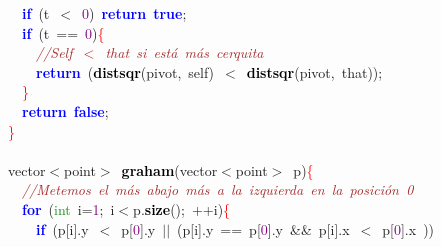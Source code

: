 {{\mbox{}\ \ \textbf{\textcolor{Blue}{if}}\ \textcolor{BrickRed}{(}t\ \textcolor{BrickRed}{$<$}\ \textcolor{Purple}{0}\textcolor{BrickRed}{)}\ \textbf{\textcolor{Blue}{return}}\ \textbf{\textcolor{Blue}{true}}\textcolor{BrickRed}{;} \\
\mbox{}\ \ \textbf{\textcolor{Blue}{if}}\ \textcolor{BrickRed}{(}t\ \textcolor{BrickRed}{==}\ \textcolor{Purple}{0}\textcolor{BrickRed}{)}\textcolor{Red}{\{} \\
\mbox{}\ \ \ \ \textit{\textcolor{Brown}{//Self\ $<$\ that\ si\ está\ más\ cerquita}} \\
\mbox{}\ \ \ \ \textbf{\textcolor{Blue}{return}}\ \textcolor{BrickRed}{(}\textbf{\textcolor{Black}{distsqr}}\textcolor{BrickRed}{(}pivot\textcolor{BrickRed}{,}\ self\textcolor{BrickRed}{)}\ \textcolor{BrickRed}{$<$}\ \textbf{\textcolor{Black}{distsqr}}\textcolor{BrickRed}{(}pivot\textcolor{BrickRed}{,}\ that\textcolor{BrickRed}{));} \\
\mbox{}\ \ \textcolor{Red}{\}} \\
\mbox{}\ \ \textbf{\textcolor{Blue}{return}}\ \textbf{\textcolor{Blue}{false}}\textcolor{BrickRed}{;} \\
\mbox{}\textcolor{Red}{\}} \\
\mbox{} \\
\mbox{}vector\textcolor{BrickRed}{$<$}point\textcolor{BrickRed}{$>$}\ \textbf{\textcolor{Black}{graham}}\textcolor{BrickRed}{(}vector\textcolor{BrickRed}{$<$}point\textcolor{BrickRed}{$>$}\ p\textcolor{BrickRed}{)}\textcolor{Red}{\{} \\
\mbox{}\ \ \textit{\textcolor{Brown}{//Metemos\ el\ más\ abajo\ más\ a\ la\ izquierda\ en\ la\ posición\ 0}} \\
\mbox{}\ \ \textbf{\textcolor{Blue}{for}}\ \textcolor{BrickRed}{(}\textcolor{ForestGreen}{int}\ i\textcolor{BrickRed}{=}\textcolor{Purple}{1}\textcolor{BrickRed}{;}\ i\textcolor{BrickRed}{$<$}p\textcolor{BrickRed}{.}\textbf{\textcolor{Black}{size}}\textcolor{BrickRed}{();}\ \textcolor{BrickRed}{++}i\textcolor{BrickRed}{)}\textcolor{Red}{\{} \\
\mbox{}\ \ \ \ \textbf{\textcolor{Blue}{if}}\ \textcolor{BrickRed}{(}p\textcolor{BrickRed}{[}i\textcolor{BrickRed}{].}y\ \textcolor{BrickRed}{$<$}\ p\textcolor{BrickRed}{[}\textcolor{Purple}{0}\textcolor{BrickRed}{].}y\ \textcolor{BrickRed}{$|$$|$}\ \textcolor{BrickRed}{(}p\textcolor{BrickRed}{[}i\textcolor{BrickRed}{].}y\ \textcolor{BrickRed}{==}\ p\textcolor{BrickRed}{[}\textcolor{Purple}{0}\textcolor{BrickRed}{].}y\ \textcolor{BrickRed}{\&\&}\ p\textcolor{BrickRed}{[}i\textcolor{BrickRed}{].}x\ \textcolor{BrickRed}{$<$}\ p\textcolor{BrickRed}{[}\textcolor{Purple}{0}\textcolor{BrickRed}{].}x\ \textcolor{BrickRed}{))} \\
}}
